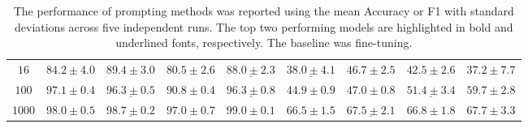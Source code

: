 \begin{table*}[!ht]
{\begin{tabular}{c | llll | llll }
        $16$
        & $84.2 \pm 4.0$
        & $\boldsymbol{89.4 \pm 3.0}$
        & $80.5 \pm 2.6$
        & $\underline{88.0 \pm 2.3}$
        & $\underline{38.0 \pm 4.1}$
        & $\boldsymbol{46.7 \pm 2.5}$
        & $42.5 \pm 2.6$
        & $37.2 \pm 7.7$ \\
        $100$
        & $\boldsymbol{97.1 \pm 0.4}$
        & $\underline{96.3 \pm 0.5}$
        & $90.8 \pm 0.4$
        & $\underline{96.3 \pm 0.8}$
        & $44.9 \pm 0.9$
        & $47.0 \pm 0.8$
        & $\underline{51.4 \pm 3.4}$
        & $\boldsymbol{59.7 \pm 2.8}$ \\	
        $1000$
        & $98.0 \pm 0.5$
        & $\underline{98.7 \pm 0.2}$
        & $97.0 \pm 0.7$
        & $\boldsymbol{99.0 \pm 0.1}$
        & $66.5 \pm 1.5$
        & $\underline{67.5 \pm 2.1}$
        & $66.8 \pm 1.8$
        & $\boldsymbol{67.7 \pm 3.3}$ \\
        \toprule
        \end{tabular}
 }
 \caption{The performance of prompting methods was reported using the mean Accuracy or F1 with standard deviations across five independent runs. The top two performing models are highlighted in bold and underlined fonts, respectively. The baseline was fine-tuning.}
 \label{tab:prompt_perform}
\end{table*}